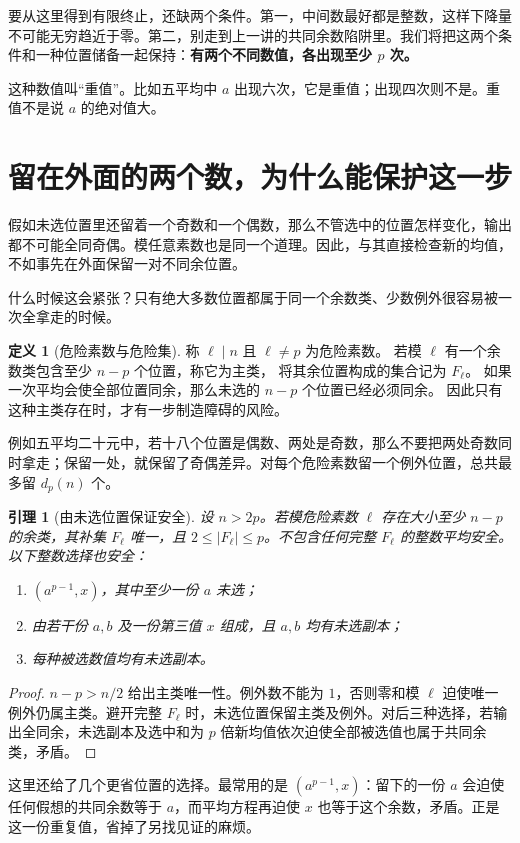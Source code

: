 \documentclass[11pt,a4paper,oneside,openany]{book}
\newtheorem{lemma}[theorem]{引理}
\theoremstyle{definition}
\newtheorem{definition}[theorem]{定义}
\numberwithin{equation}{chapter}
\begin{document}
要从这里得到有限终止，还缺两个条件。第一，中间数最好都是整数，这样下降量不可能无穷趋近于零。第二，别走到上一讲的共同余数陷阱里。我们将把这两个条件和一种位置储备一起保持：\textbf{有两个不同数值，各出现至少 $p$ 次。}

这种数值叫“重值”。比如五平均中 $a$ 出现六次，它是重值；出现四次则不是。重值不是说 $a$ 的绝对值大。

\section{留在外面的两个数，为什么能保护这一步}
假如未选位置里还留着一个奇数和一个偶数，那么不管选中的位置怎样变化，输出都不可能全同奇偶。模任意素数也是同一个道理。因此，与其直接检查新的均值，不如事先在外面保留一对不同余位置。

什么时候这会紧张？只有绝大多数位置都属于同一个余数类、少数例外很容易被一次全拿走的时候。
\begin{definition}[危险素数与危险集]
称 $\ell\mid n$ 且 $\ell\ne p$ 为危险素数。
若模 $\ell$ 有一个余数类包含至少 $n-p$ 个位置，称它为主类，
将其余位置构成的集合记为 $F_\ell$。
如果一次平均会使全部位置同余，那么未选的 $n-p$ 个位置已经必须同余。
因此只有这种主类存在时，才有一步制造障碍的风险。
\end{definition}
例如五平均二十元中，若十八个位置是偶数、两处是奇数，那么不要把两处奇数同时拿走；保留一处，就保留了奇偶差异。对每个危险素数留一个例外位置，总共最多留 $d_p(n)$ 个。
\begin{lemma}[由未选位置保证安全]\label{lem:safety}
设 $n>2p$。若模危险素数 $\ell$ 存在大小至少 $n-p$ 的余类，其补集 $F_\ell$ 唯一，且 $2\le|F_\ell|\le p$。不包含任何完整 $F_\ell$ 的整数平均安全。以下整数选择也安全：
\begin{enumerate}
\item $(a^{p-1},x)$，其中至少一份 $a$ 未选；
\item 由若干份 $a,b$ 及一份第三值 $x$ 组成，且 $a,b$ 均有未选副本；
\item 每种被选数值均有未选副本。
\end{enumerate}
\end{lemma}
\begin{proof}
$n-p>n/2$ 给出主类唯一性。例外数不能为 $1$，否则零和模 $\ell$ 迫使唯一例外仍属主类。避开完整 $F_\ell$ 时，未选位置保留主类及例外。对后三种选择，若输出全同余，未选副本及选中和为 $p$ 倍新均值依次迫使全部被选值也属于共同余类，矛盾。
\end{proof}
这里还给了几个更省位置的选择。最常用的是 $(a^{p-1},x)$：留下的一份 $a$ 会迫使任何假想的共同余数等于 $a$，而平均方程再迫使 $x$ 也等于这个余数，矛盾。正是这一份重复值，省掉了另找见证的麻烦。
\end{document}
